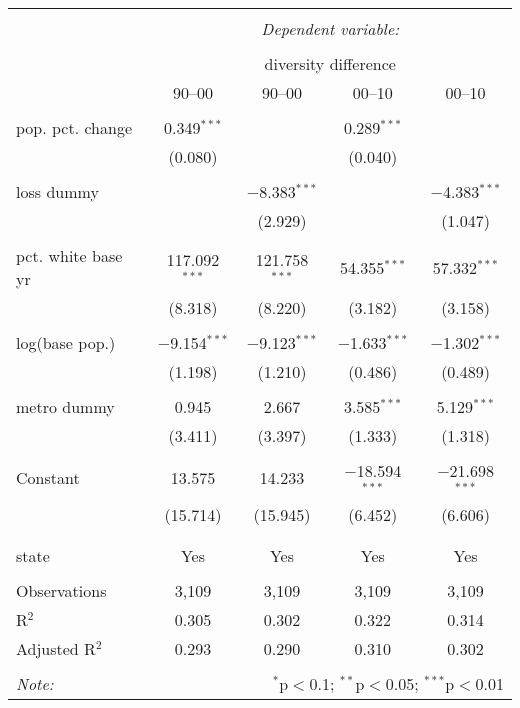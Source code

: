 \documentclass{standalone}
\begin{document}
\begin{tabular}{@{\extracolsep{5pt}}lcccc} 
\\[-1.8ex]\hline 
\hline \\[-1.8ex] 
 & \multicolumn{4}{c}{\textit{Dependent variable:}} \\ 
\cline{2-5} 
\\[-1.8ex] & \multicolumn{4}{c}{diversity difference} \\ 
 & 90--00 & 90--00 & 00--10 & 00--10 \\ 
\hline \\[-1.8ex] 
 pop. pct. change & 0.349$^{***}$ &  & 0.289$^{***}$ &  \\ 
  & (0.080) &  & (0.040) &  \\ 
  & & & & \\ 
 loss dummy &  & $-$8.383$^{***}$ &  & $-$4.383$^{***}$ \\ 
  &  & (2.929) &  & (1.047) \\ 
  & & & & \\ 
 pct. white base yr & 117.092$^{***}$ & 121.758$^{***}$ & 54.355$^{***}$ & 57.332$^{***}$ \\ 
  & (8.318) & (8.220) & (3.182) & (3.158) \\ 
  & & & & \\ 
 log(base pop.) & $-$9.154$^{***}$ & $-$9.123$^{***}$ & $-$1.633$^{***}$ & $-$1.302$^{***}$ \\ 
  & (1.198) & (1.210) & (0.486) & (0.489) \\ 
  & & & & \\ 
 metro dummy & 0.945 & 2.667 & 3.585$^{***}$ & 5.129$^{***}$ \\ 
  & (3.411) & (3.397) & (1.333) & (1.318) \\ 
  & & & & \\ 
 Constant & 13.575 & 14.233 & $-$18.594$^{***}$ & $-$21.698$^{***}$ \\ 
  & (15.714) & (15.945) & (6.452) & (6.606) \\ 
  & & & & \\ 
\hline \\[-1.8ex] 
state & Yes & Yes & Yes & Yes \\ 
\hline \\[-1.8ex] 
Observations & 3,109 & 3,109 & 3,109 & 3,109 \\ 
R$^{2}$ & 0.305 & 0.302 & 0.322 & 0.314 \\ 
Adjusted R$^{2}$ & 0.293 & 0.290 & 0.310 & 0.302 \\ 
\hline 
\hline \\[-1.8ex] 
\textit{Note:}  & \multicolumn{4}{r}{$^{*}$p$<$0.1; $^{**}$p$<$0.05; $^{***}$p$<$0.01} \\ 
\end{tabular} 
\end{document}
